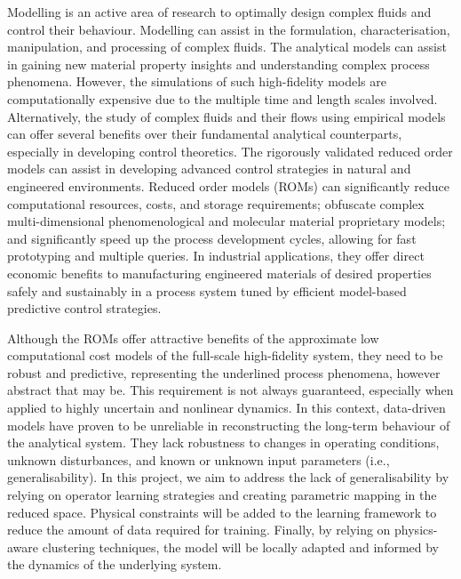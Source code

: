 \documentclass[oneside,11pt,a4paper]{article}
\begin{document}
Modelling is an active area of research to optimally design complex fluids and control their behaviour. Modelling can assist in the formulation, characterisation, manipulation, and processing of complex fluids. The analytical models can assist in gaining new material property insights and understanding complex process phenomena. However, the simulations of such high-fidelity models are computationally expensive due to the multiple time and length scales involved. Alternatively, the study of complex fluids and their flows using empirical models can offer several benefits over their fundamental analytical counterparts, especially in developing control theoretics. The rigorously validated reduced order models can assist in developing advanced control strategies in natural and engineered environments. Reduced order models (ROMs) can significantly reduce computational resources, costs, and storage requirements; obfuscate complex multi-dimensional phenomenological and molecular material proprietary models; and significantly speed up the process development cycles, allowing for fast prototyping and multiple queries. In industrial applications, they offer direct economic benefits to manufacturing engineered materials of desired properties safely and sustainably in a process system tuned by efficient model-based predictive control strategies.

Although the ROMs offer attractive benefits of the approximate low computational cost models of the full-scale high-fidelity system, they need to be robust and predictive, representing the underlined process phenomena, however abstract that may be. This requirement is not always guaranteed, especially when applied to highly uncertain and nonlinear dynamics. In this context, data-driven models have proven to be unreliable in reconstructing the long-term behaviour of the analytical system. They lack robustness to changes in operating conditions, unknown disturbances, and known or unknown input parameters (i.e., generalisability). In this project, we aim to address the lack of generalisability by relying on operator learning strategies and creating parametric mapping in the reduced space. Physical constraints will be added to the learning framework to reduce the amount of data required for training. Finally, by relying on physics-aware clustering techniques, the model will be locally adapted and informed by the dynamics of the underlying system.
\end{document}
